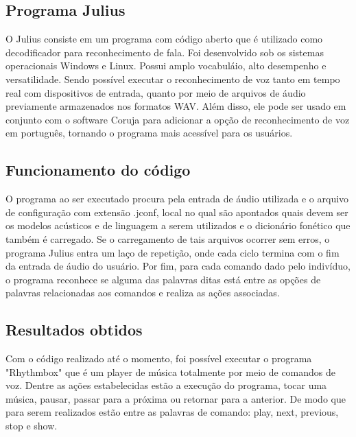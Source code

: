 \subsection{Programa Julius}

O Julius consiste em um programa com código aberto que é utilizado como decodificador para reconhecimento de fala. 
Foi desenvolvido sob os sistemas operacionais Windows e Linux. Possui amplo vocabuláio, alto desempenho e versatilidade. 
Sendo possível executar o reconhecimento de voz tanto em tempo real com dispositivos de entrada, quanto por meio de arquivos de áudio previamente armazenados nos formatos WAV.
Além disso, ele pode ser usado em conjunto com o software Coruja para adicionar a opção de reconhecimento de voz em português, tornando o programa mais acessível para os usuários.


\subsection{Funcionamento do código}

O programa ao ser executado procura pela entrada de áudio utilizada e o arquivo de configuração com extensão .jconf, local no qual são apontados quais devem ser os modelos acústicos e de linguagem a serem utilizados e o dicionário fonético que também é carregado. 
Se o carregamento de tais arquivos ocorrer sem erros, o programa Julius entra um laço de repetição, onde cada ciclo termina com o fim da entrada de áudio do usuário. Por fim, para cada comando dado pelo indivíduo, o programa reconhece se alguma das palavras ditas está entre as opções de palavras relacionadas aos comandos e realiza as ações associadas.  

\subsection{Resultados obtidos}

Com o código realizado até o momento, foi possível executar o programa "Rhythmbox" que é um player de música totalmente por meio de comandos de voz. 
Dentre as ações estabelecidas estão a execução do programa, tocar uma música, pausar, passar para a próxima ou retornar para a anterior.
De modo que para serem realizados estão entre as palavras de comando: play, next, previous, stop e show.



